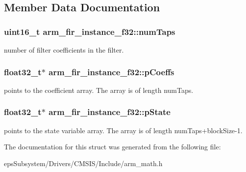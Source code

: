 \subsection{Member Data Documentation}
\hypertarget{structarm__fir__instance__f32_a20cf98c92b5323799b7881c9ff4d2f7c}{
\subsubsection[{num\-Taps}]{\setlength{\rightskip}{0pt plus 5cm}uint16\-\_\-t arm\-\_\-fir\-\_\-instance\-\_\-f32\-::num\-Taps}}\label{structarm__fir__instance__f32_a20cf98c92b5323799b7881c9ff4d2f7c}
number of filter coefficients in the filter. \hypertarget{structarm__fir__instance__f32_a1c9cfca901d5902afeb640f2831488f4}{
\subsubsection[{p\-Coeffs}]{\setlength{\rightskip}{0pt plus 5cm}float32\-\_\-t$\ast$ arm\-\_\-fir\-\_\-instance\-\_\-f32\-::p\-Coeffs}}\label{structarm__fir__instance__f32_a1c9cfca901d5902afeb640f2831488f4}
points to the coefficient array. The array is of length num\-Taps. \hypertarget{structarm__fir__instance__f32_a7afcf4022e8560db9b8fd28b0d090a15}{
\subsubsection[{p\-State}]{\setlength{\rightskip}{0pt plus 5cm}float32\-\_\-t$\ast$ arm\-\_\-fir\-\_\-instance\-\_\-f32\-::p\-State}}\label{structarm__fir__instance__f32_a7afcf4022e8560db9b8fd28b0d090a15}
points to the state variable array. The array is of length num\-Taps+block\-Size-\/1. 

The documentation for this struct was generated from the following file\-:\begin{DoxyCompactItemize}
\item 
eps\-Subsystem/\-Drivers/\-C\-M\-S\-I\-S/\-Include/arm\-\_\-math.\-h\end{DoxyCompactItemize}
